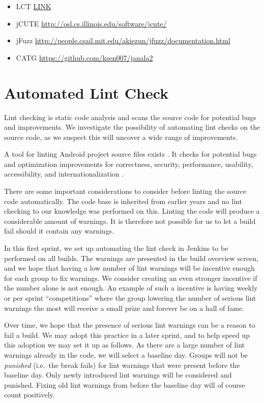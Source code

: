 
\begin{itemize}
  \item LCT \href{http://users.ics.aalto.fi/ktkahkon/KahLauSaaKauHelNie-BYTECODE2011.pdf}{LINK}
  \item jCUTE \url{http://osl.cs.illinois.edu/software/jcute/}
  \item jFuzz \url{http://people.csail.mit.edu/akiezun/jfuzz/documentation.html}
  \item CATG \url{https://github.com/ksen007/janala2}
\end{itemize}


\section{Automated Lint Check}\label{sec:automated_lint}
Lint checking is static code analysis and scans the source code for potential bugs and improvements. We investigate the possibility of automating lint checks on the source code, as we suspect this will uncover a wide range of improvements.

A tool for linting Android project source files exists . It checks for potential bugs and optimization improvements for correctness, security, performance, usability, accessibility, and internationalization \parencite{AndroidLint}.

There are some important considerations to consider before linting the source code automatically. The code base is inherited from earlier years and no lint checking to our knowledge was performed on this. Linting the code will produce a considerable amount of warnings. It is therefore not possible for us to let a build fail should it contain any warnings.

In this first sprint, we set up automating the lint check in Jenkins to be performed on all builds. The warnings are presented in the build overview screen, and we hope that having a low number of lint warnings will be incentive enough for each group to fix warnings. We consider creating an even stronger incentive if the number alone is not enough. An example of such a incentive is having weekly or per sprint ``competitions'' where the group lowering the number of serious lint warnings the most will receive a small prize and forever be on a hall of fame.

Over time, we hope that the presence of serious lint warnings can be a reason to fail a build. We may adopt this practice in a later sprint, and to help speed up this adoption we may set it up as follows. As there are a large number of lint warnings already in the code, we will select a baseline day. Groups will not be \emph{punished} (i.e.\ the break fails) for lint warnings that were present before the baseline day. Only newly introduced lint warnings will be considered and punished. Fixing old lint warnings from before the baseline day will of course count positively. %

